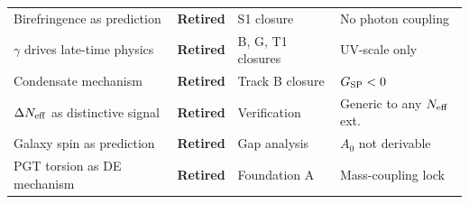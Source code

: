 \documentclass[aps,prd,twocolumn,superscriptaddress,showpacs,preprintnumbers,
  nofootinbib,longbibliography,floatfix]{revtex4-2}
\newcommand{\Neff}{N_{\rm eff}}
\newcommand{\BI}{\gamma}
\newcommand{\Gsp}{G_{\rm SP}}
\begin{document}
\begin{table}[t]
\begin{ruledtabular}
\begin{tabular}{llll}
Birefringence as prediction & \textbf{Retired} & S1 closure & No photon coupling \\
$\BI$ drives late-time physics & \textbf{Retired} & B, G, T1 closures & UV-scale only \\
Condensate mechanism & \textbf{Retired} & Track B closure & $\Gsp < 0$ \\
$\Delta\Neff$ as distinctive signal & \textbf{Retired} & Verification & Generic to any $\Neff$ ext. \\
Galaxy spin as prediction & \textbf{Retired} & Gap analysis & $A_0$ not derivable \\
PGT torsion as DE mechanism & \textbf{Retired} & Foundation A & Mass-coupling lock \\
\end{tabular}
\end{ruledtabular}
\end{table}


\end{document}
